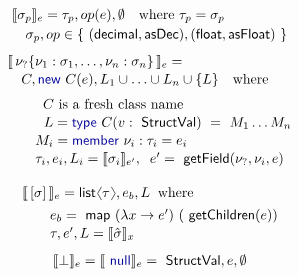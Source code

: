 \documentclass[10pt,preprint,blind,clearpagebib]{sigplanconf}
\newcommand{\langl}{\begin{picture}(4.5,7)
\put(1.1,2.5){\rotatebox{60}{\line(1,0){5.5}}}
\put(1.1,2.5){\rotatebox{300}{\line(1,0){5.5}}}
\end{picture}}
\newcommand{\rangl}{\begin{picture}(4.5,7)
\put(.9,2.5){\rotatebox{120}{\line(1,0){5.5}}}
\put(.9,2.5){\rotatebox{240}{\line(1,0){5.5}}}
\end{picture}}
\newcommand{\kvd}[1]{\textnormal{\textcolor{kvdclr}{\sffamily #1}}}
\newcommand{\ident}[1]{\textnormal{\sffamily #1}}
\newcommand{\sem}[1]{\llbracket #1 \rrbracket}
\begin{document}
\begin{figure}
\begin{multicols}{2}
\noindent
\begin{equation*}
\begin{array}{l}
 \sem{\sigma_p}_e = \tau_p,op(e),\emptyset\quad\textnormal{where}~\tau_p = \sigma_p \\[0.2em]
\quad\sigma_p, op\in  \{~(\ident{decimal},\ident{asDec}), (\ident{float},\ident{asFloat})~\}
\end{array}
\end{equation*}
%
\begin{equation*}
\begin{array}{l}
 \sem{\,\nu_? \{ \nu_1 : \sigma_1, \ldots, \nu_n : \sigma_n \}\,}_e = \\[0.1em]
 \quad C, \kvd{new}~C(e), L_1\cup\ldots\cup L_n\cup\{ L \}\quad\textnormal{where}\\[0.6em]
 \qquad \;\;C~\textnormal{is a fresh class name} \\[0.1em]
 \qquad \;\,\,L = \kvd{type}~C(v:\ident{StructVal})~=~M_1\ldots M_n  \\[0.1em]
 \qquad M_i = \kvd{member}~\nu_i:\tau_i=e_i\\[0.1em]
 \qquad \tau_i, e_i, L_i = \sem{\sigma_i}_{e'},\;\; e'=\ident{getField}(\nu_?, \nu_i, e)\\[0.6em]
\end{array}
\end{equation*}
%
\begin{equation*}
\begin{array}{l}
 \sem{\,[\sigma]\,}_e = \ident{list}\langl\tau\rangl, e_b, L \;\;\textnormal{where}\\[0.4em]
 \qquad e_b = \ident{map}~(\lambda x\rightarrow e')~(\ident{getChildren}(e)) \\[0.1em]
 \qquad \tau, e', L = \sem{\hat{\sigma}}_x
\end{array}
\end{equation*}
%
\begin{equation*}
\begin{array}{l}
 \sem{\bot}_e = \sem{\kvd{null}}_e = \ident{StructVal}, e, \emptyset
\end{array}
\end{equation*}


\end{multicols}
\end{figure}
\end{document}
